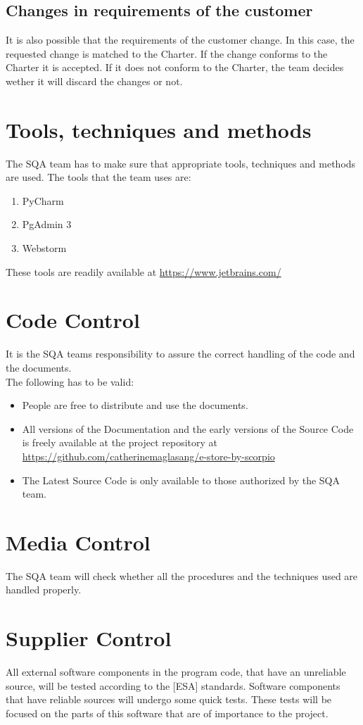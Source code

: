 \documentclass{report}
\begin{document}
\subsection{Changes in requirements of the customer}
It is also possible that the requirements of the customer change. In this case, the requested change is matched to the Charter. If the change conforms to the Charter it is accepted. If it does not conform to the Charter, the team decides wether it will discard the changes or not.

\section{Tools, techniques and methods}
The SQA team has to make sure that appropriate tools, techniques and methods are used. The tools that the team uses are:
\begin{enumerate}
\item PyCharm
\item PgAdmin 3
\item Webstorm
\end{enumerate}
These tools are readily available at \url {https://www.jetbrains.com/}

\section{Code Control}
It is the SQA teams responsibility to assure the correct handling of the code and the documents.\\
The following has to be valid:
\begin{itemize}
\item People are free to distribute and use the documents.
\item All versions of the Documentation and the early versions of the Source Code is freely available at the project repository at \url {https://github.com/catherinemaglasang/e-store-by-scorpio} 
\item The Latest Source Code is only available to those authorized by the SQA team.
\end{itemize}

\section{Media Control}
The SQA team will check whether all the procedures and the techniques used are handled properly.

\section{Supplier Control}
All external software components in the program code, that have an unreliable source, will be tested according to the [ESA] standards. Software components that  have reliable sources will undergo some quick tests. These tests will be focused on the parts of this software that are of importance to the project.
\end{document}
